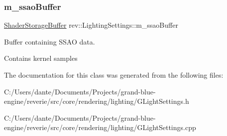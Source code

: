 \subsubsection{\texorpdfstring{m\_ssaoBuffer}{m\_ssaoBuffer}}
{\footnotesize\ttfamily \mbox{\hyperlink{classrev_1_1_shader_storage_buffer}{Shader\+Storage\+Buffer}} rev\+::\+Lighting\+Settings\+::m\+\_\+ssao\+Buffer\hspace{0.3cm}{\ttfamily [protected]}}



Buffer containing S\+S\+AO data. 

Contains kernel samples 

The documentation for this class was generated from the following files\+:\begin{DoxyCompactItemize}
\item 
C\+:/\+Users/dante/\+Documents/\+Projects/grand-\/blue-\/engine/reverie/src/core/rendering/lighting/G\+Light\+Settings.\+h\item 
C\+:/\+Users/dante/\+Documents/\+Projects/grand-\/blue-\/engine/reverie/src/core/rendering/lighting/G\+Light\+Settings.\+cpp\end{DoxyCompactItemize}
